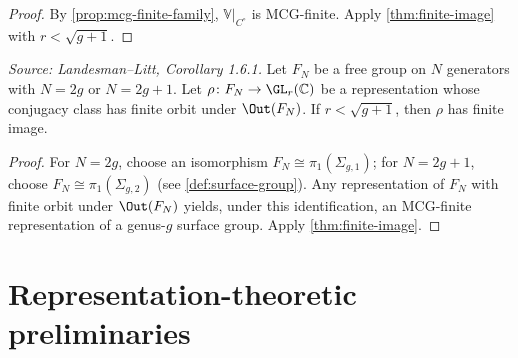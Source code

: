 \begin{proof}
  By \cref{prop:mcg-finite-family}, $\mathbb{V}|_{C^\circ}$ is MCG-finite.
  Apply \cref{thm:finite-image} with $r < \sqrt{g+1}$.
\end{proof}

\begin{corollary}
  \label{cor:free-groups}
  \textit{Source: Landesman--Litt, Corollary 1.6.1.}
  Let $F_N$ be a free group on $N$ generators with $N = 2g$ or $N = 2g+1$.
  Let $\rho\colon F_N \to \GL_r(\mathbb{C})$ be a representation whose
  conjugacy class has finite orbit under $\Out(F_N)$.
  If $r < \sqrt{g+1}$, then $\rho$ has finite image.
\end{corollary}

\begin{proof}
  For $N = 2g$, choose an isomorphism $F_N \cong \pi_1(\Sigma_{g,1})$; for
  $N = 2g+1$, choose $F_N \cong \pi_1(\Sigma_{g,2})$ (see
  \cref{def:surface-group}).
  Any representation of $F_N$ with finite orbit under $\Out(F_N)$ yields,
  under this identification, an MCG-finite representation of a genus-$g$
  surface group.
  Apply \cref{thm:finite-image}.
\end{proof}

\section{Representation-theoretic preliminaries}


